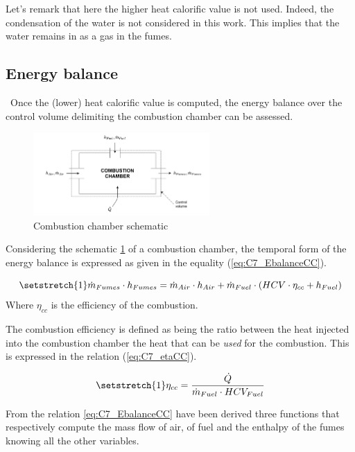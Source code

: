 Let's remark that here the higher heat calorific value is not used. Indeed, the condensation of the water is not considered in this work. This implies that the water remains in as a gas in the fumes.

\subsection{Energy balance}
\quad\ Once the (lower) heat calorific value is computed, the energy balance over the control volume delimiting the combustion chamber can be assessed.

\begin{figure}[h]
    \centering
    \includegraphics[width=0.6\textwidth]{Chapitre_7/Images/CC.png}
    \caption{Combustion chamber schematic}
    \label{fig:C7_CC}
\end{figure}

 Considering the schematic \ref{fig:C7_CC} of a combustion chamber, the temporal form of the energy balance is expressed as given in the equality (\ref{eq:C7_EbalanceCC}).
 
\begin{equation}
    \setstretch{1}
    \dot{m}_{Fumes}\cdot h_{Fumes} =  \dot{m}_{Air}\cdot h_{Air} + \dot{m}_{Fuel}\cdot\left(HCV\cdot \eta_{cc} + h_{Fuel}\right)\label{eq:C7_EbalanceCC}
\end{equation}
Where $\eta_{cc}$ is the efficiency of the combustion. 

The combustion efficiency is defined as being the ratio between the heat injected into the combustion chamber the heat that can be \textit{used} for the combustion. This is expressed in the relation (\ref{eq:C7_etaCC}).

\begin{equation}
    \setstretch{1}
    \eta_{cc} = \frac{\dot{Q}}{\dot{m}_{Fuel}\cdot HCV_{Fuel}}\label{eq:C7_etaCC}
\end{equation}

From the relation \ref{eq:C7_EbalanceCC} have been derived three functions that respectively compute the mass flow of air, of fuel and the enthalpy of the fumes knowing all the other variables.

